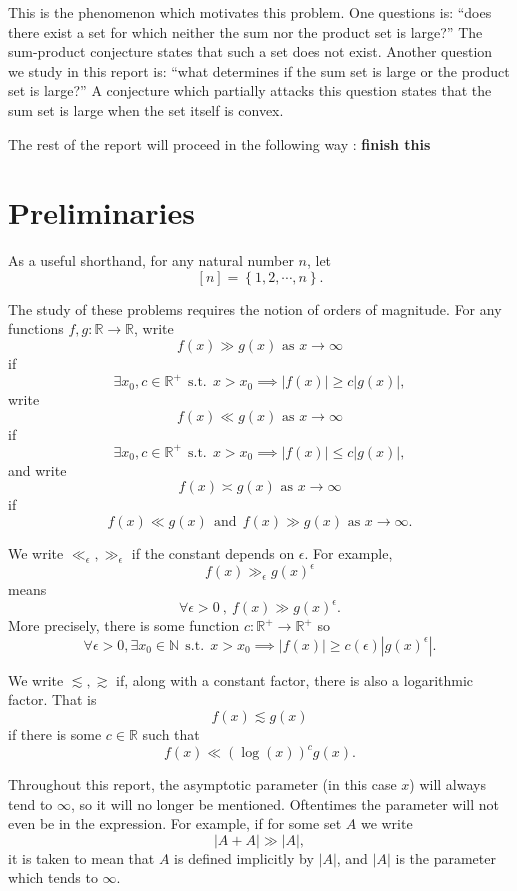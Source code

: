 \documentclass[12pt,reqno]{amsart}
\begin{document}
This is the phenomenon which motivates this problem.
One questions is: ``does there exist a set for which neither the sum nor the product set is large?''
The sum-product conjecture states that such a set does not exist. 
Another question we study in this report is: ``what
determines if the sum set is large or the product set is large?'' A
conjecture which partially attacks this question states that the sum set is large
when the set itself is convex.

The rest of the report will proceed in the following way : \textbf{finish this}

\section{Preliminaries}

As a useful shorthand, for any natural number \(n\), let
\[
    [n] = \left\{ 1, 2 , \cdots , n \right\} 
.\]

The study of these problems requires the notion of orders of magnitude.
For any functions \(f,g: \mathbb{R}   \to \mathbb{R} \), write
\[
    f(x) \gg g(x) \text{ as } x \to \infty 
\]
if
\[
    \exists x_0,c \in \mathbb{R} ^{+}~~\text{s.t.}~~ x > x_0 \implies \left\lvert f(x) \right\rvert \geq c \left\lvert g(x) \right\rvert  
,\]
write
\[
    f(x) \ll g(x) \text{ as } x \to \infty 
\]
if
\[
     \exists x_0,c \in \mathbb{R} ^{+}~~\text{s.t.}~~ x > x_0 \implies \left\lvert f(x) \right\rvert \leq c \left\lvert g(x) \right\rvert 
,\]
and write
\[
    f(x) \asymp g(x) \text{ as } x \to \infty 
\]
if
\[
    f(x) \ll g(x)  ~ ~ \text{and} ~ ~ f(x) \gg g(x) \text{ as } x \to \infty 
.\]

We write \(\ll _{\epsilon},\gg _{\epsilon} \) if the constant depends on \(\epsilon\). For example,
\[
    f(x) \gg _{\epsilon} g(x) ^{ \epsilon}
\]
means
\[
   \forall \epsilon> 0~,~ f(x) \gg g(x) ^{\epsilon}
.\]
More precisely, there is some function \(c : \mathbb{R} ^{+ }\to \mathbb{R} ^{+}\) so
\[
    \forall \epsilon > 0, \exists x_0\in \mathbb{N} ~~\text{s.t.}~~ x > x_0 \implies \left\lvert f(x) \right\rvert \geq c (\epsilon)\left\lvert g(x) ^{\epsilon} \right\rvert
.\]

We write \(\lesssim , \gtrsim \) if, along with a constant factor, there is also a logarithmic factor.
That is
\[
    f(x) \lesssim  g(x)
\]
if there is some \(c \in \mathbb{R} \) such that
\[
    f(x) \ll \left( \log \left( x \right)  \right) ^{c} g(x)
.\]

Throughout this report, the asymptotic parameter (in this case \(x\)) will always tend to \(\infty \),
so it will no longer be mentioned.
Oftentimes the parameter will not even be in the expression. For example,
if for some set \(A\) we write
\[
    \left\lvert A + A \right\rvert \gg \left\lvert A \right\rvert 
,\]
it is taken to mean that \(A\) is defined implicitly by \(\left\lvert A \right\rvert \), and
\(\left\lvert A \right\rvert \) is the parameter which tends to \(\infty \).
\end{document}
